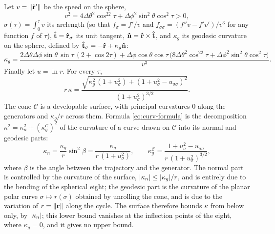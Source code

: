 Let \(v = \norm{\vu r'}\) be the speed on the sphere,
\begin{equation}
    v^2 = 4\Delta\theta^2\cos^22\tau + \Delta\phi^2\sin^2\theta\cos^2\tau > 0,
\end{equation}
\(\sigma(\tau) = \int_0^\tau v\) its arclength (so that \(f_\sigma = f'/v\) and \(f_{\sigma\sigma} = (f''v-f'v')/v^3\) for any function \(f\) of \(\tau\)), \(\vu t = \vu r_\sigma\) its unit tangent, \(\vu n = \vu r\times\vu t\), and \(\kappa_g\) its geodesic curvature on the sphere, defined by \(\vu t_\sigma = -\vu r + \kappa_g\vu n\):
\begin{equation} \label{eq:curv-kg}
    \kappa_g = \frac{2\Delta\theta\Delta\phi\sin\theta\,\sin\tau\,(2+\cos2\tau) + \Delta\phi\cos\theta\cos\tau\,\bigl(8\Delta\theta^2\cos^22\tau + \Delta\phi^2\sin^2\theta\cos^2\tau\bigr)}{v^3}.
\end{equation}
Finally let \(u = \ln r\).
For every \(\tau\),
\begin{equation} \label{eq:curv-formula}
    r\,\kappa = \frac{\sqrt{\kappa_g^2\,(1+u_\sigma^2) + (1+u_\sigma^2-u_{\sigma\sigma})^2}}{(1+u_\sigma^2)^{3/2}}.
\end{equation}
The cone \(\mathscr C\) is a developable surface, with principal curvatures \(0\) along the generators and \(\kappa_g/r\) across them.
Formula \eqref{eq:curv-formula} is the decomposition \(\kappa^2 = \kappa_n^2 + (\kappa_g^{\mathscr C})^2\) of the curvature of a curve drawn on \(\mathscr C\) into its normal and geodesic parts:
\begin{equation}
    \kappa_n = \frac{\kappa_g}{r}\sin^2\beta = \frac{\kappa_g}{r\,(1+u_\sigma^2)}, \qquad \kappa_g^{\mathscr C} = \frac{1+u_\sigma^2-u_{\sigma\sigma}}{r\,(1+u_\sigma^2)^{3/2}},
\end{equation}
where \(\beta\) is the angle between the trajectory and the generator.
The normal part is controlled by the curvature of the surface, \(\abs{\kappa_n}\le\abs{\kappa_g}/r\), and is entirely due to the bending of the spherical eight; the geodesic part is the curvature of the planar polar curve \(\sigma\mapsto r(\sigma)\) obtained by unrolling the cone, and is due to the variation of \(r=\norm{\vb r}\) along the cycle.
The surface therefore bounds \(\kappa\) from below only, by \(\abs{\kappa_n}\); this lower bound vanishes at the inflection points of the eight, where \(\kappa_g=0\), and it gives no upper bound.

